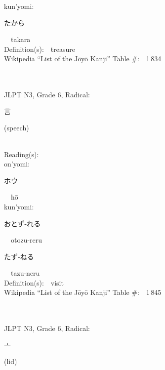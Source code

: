 \begin{multicols}{2}
{\hspace*{1em}}kun'yomi:\ \ \\
{\hspace*{2em}}{\begin{CJK}{UTF8}{min} たから \end{CJK}}\ \ takara\ \ \\
Definition(s):\ \ treasure \\
Wikipedia ``List of the J\=oy\=o Kanji'' Table \#:\ \ 1\,834 \\
\ \ \\
{\fontsize{34pt}{40pt}  }\ \ \\  %
{JLPT N3, Grade 6, Radical:\ \ {\begin{CJK}{UTF8}{min} 言 \end{CJK}} (speech) } \\
Reading(s):\ \ \\
{\hspace*{1em}}on'yomi:\ \ \\
{\hspace*{2em}}{\begin{CJK}{UTF8}{min} ホウ \end{CJK}}\ \ h\=o\ \ \\
{\hspace*{1em}}kun'yomi:\ \ \\
{\hspace*{2em}}{\begin{CJK}{UTF8}{min} おとず-れる \end{CJK}}\ \ otozu-reru\ \ \\
{\hspace*{2em}}{\begin{CJK}{UTF8}{min} たず-ねる \end{CJK}}\ \ tazu-neru\ \ \\
Definition(s):\ \ visit \\
Wikipedia ``List of the J\=oy\=o Kanji'' Table \#:\ \ 1\,845 \\
\ \ \\
{\fontsize{34pt}{40pt}  }\ \ \\  %
{JLPT N3, Grade 6, Radical:\ \ {\begin{CJK}{UTF8}{min} 亠 \end{CJK}} (lid) } \\

\end{multicols}

